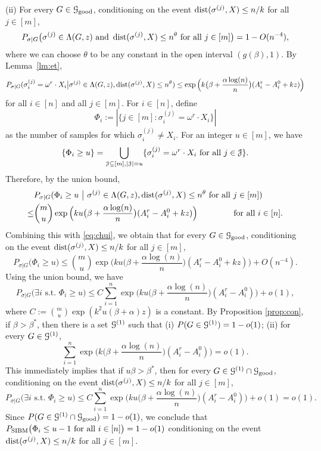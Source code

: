 \documentclass{article}
\begin{document}
\noindent (ii) For every $G\in\mathcal{G}_{\operatorname{good}}$, conditioning on the event $\operatorname{dist}(\sigma^{(j)}, X) \le n/k$ for all $j\in[m]$,
\begin{equation}  \label{eq:chui}
P_{\sigma|G} \big( \sigma^{(j)}\in  \Lambda(G, z)
\text{~and~} \operatorname{dist}(\sigma^{(j)}, X) \le n^\theta
\text{~for all~} j\in[m]  \big) 
=1- O(n^{-4}) ,
\end{equation}
where we can choose $\theta$ to be any constant in the open interval $(g(\beta), 1)$.
By Lemma~\ref{lm:et},
$$
P_{\sigma|G}(\sigma_i^{(j)} = \omega^r \cdot X_i \big| \sigma^{(j)}\in \Lambda(G,z) ,\operatorname{dist}(\sigma^{(j)}, X) \le n^{\theta} ) 
\le  \exp\Big(k\big(\beta+\frac{\alpha\log(n)}{n} \big) (A^r_i-A^0_i + kz) \Big)
$$
for all $i\in[n]$ and all $j\in[m]$.
For $i\in[n]$, define 
$$
\Phi_i := |\{j\in[m]: \sigma_i^{(j)} = \omega^r \cdot X_i\}|
$$
as the number of samples for which $\sigma_i^{(j)} \neq X_i$.
For an integer $u\in[m]$, we have
$$
\{\Phi_i \ge u\} =
\bigcup_{\mathcal{J}\subseteq[m], |\mathcal{J}|=u}
\{\sigma_i^{(j)} = \omega^r \cdot X_i \text{~for all~} j\in \mathcal{J}\} .
$$
Therefore, by the union bound,
\begin{align*}
& P_{\sigma|G}( \Phi_i \ge u  ~\big|~  \sigma^{(j)}\in \Lambda(G,z) ,\operatorname{dist}(\sigma^{(j)}, X) \le n^{\theta} \text{~for all~} j\in[m] ) \\
\le &  \binom{m}{u} \exp\Big(ku\big(\beta+\frac{\alpha\log(n)}{n} \big) (A^r_i-A^0_i + kz) \Big)
\quad\quad\quad\quad\text{~for all~} i\in[n] .
\end{align*}
Combining this with \eqref{eq:chui}, we obtain that for every $G\in\mathcal{G}_{\operatorname{good}}$, conditioning on the event $\operatorname{dist}(\sigma^{(j)}, X) \le n/k$ for all $j\in[m]$,
$$
P_{\sigma|G} \big( \Phi_i \ge u \big) \le  \binom{m}{u} \exp\Big(ku \big(\beta+\frac{\alpha\log(n)}{n} \big) (A^r_i-A^0_i + kz) \Big) + O(n^{-4}).
$$
Using the union bound, we have
$$
P_{\sigma|G} \big(\exists i \text{~s.t.~} \Phi_i \ge u \big) \le 
C  \sum_{i=1}^n \exp\Big(ku \big(\beta+\frac{\alpha\log(n)}{n} \big) (A^r_i-A^0_i ) \Big) + o(1) ,
$$
where $C:=\binom{m}{u}\exp(k^2u(\beta+\alpha)z)$ is a constant.
By Proposition \ref{prop:con}, if $\beta>\beta^*$, then there is a set $\mathcal{G}^{(1)}$ such that (i) $P(G\in \mathcal{G}^{(1)})=1-o(1)$; (ii) for every $G\in\mathcal{G}^{(1)}$,
$$
\sum_{i=1}^n \exp\Big(k \big(\beta+\frac{\alpha\log(n)}{n} \big) (A^r_i-A^0_i ) \Big) = o(1) .
$$
This immediately implies that if $u\beta>\beta^*$, then for every $G\in\mathcal{G}^{(1)}\cap\mathcal{G}_{\operatorname{good}}$, conditioning on the event $\operatorname{dist}(\sigma^{(j)}, X) \le n/k$ for all $j\in[m]$,
$$
P_{\sigma|G} \big(\exists i \text{~s.t.~} \Phi_i \ge u \big) \le 
C\sum_{i=1}^n \exp\Big(ku \big(\beta+\frac{\alpha\log(n)}{n} \big) (A^r_i-A^0_i ) \Big) + o(1) =o(1).
$$
Since $P(G\in\mathcal{G}^{(1)}\cap\mathcal{G}_{\operatorname{good}})=1-o(1)$, we conclude that $P_{\operatorname{SIBM}} \big(\Phi_i \le u-1 \text{~for all~} i\in[n] \big)=1-o(1)$ conditioning on the event $\operatorname{dist}(\sigma^{(j)}, X) \le n/k$ for all $j\in[m]$.
\end{document}
